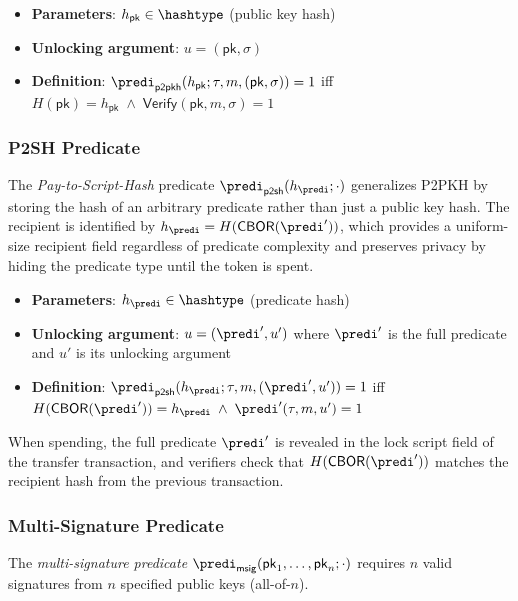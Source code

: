 \begin{itemize}
	\item \textbf{Parameters}: $h_\mathsf{pk} \in \hashtype$ (public key hash)
	\item \textbf{Unlocking argument}: $u = (\mathsf{pk}, \sigma)$
	\item \textbf{Definition}: $\predi_\mathsf{p2pkh}(h_\mathsf{pk}; \tau, m, (\mathsf{pk}, \sigma)) = 1$ iff $H(\mathsf{pk}) = h_\mathsf{pk} \;\land\; \mathsf{Verify}(\mathsf{pk}, m, \sigma) = 1$
\end{itemize}

\subsubsection{P2SH Predicate}\label{sec:p2sh}

The \emph{Pay-to-Script-Hash} predicate $\predi_\mathsf{p2sh}(h_\predi;\cdot)$ generalizes P2PKH by storing the hash of an arbitrary predicate rather than just a public key hash. The recipient is identified by $h_\predi = H(\mathsf{CBOR}(\predi'))$, which provides a uniform-size recipient field regardless of predicate complexity and preserves privacy by hiding the predicate type until the token is spent.

\begin{itemize}
	\item \textbf{Parameters}: $h_\predi \in \hashtype$ (predicate hash)
	\item \textbf{Unlocking argument}: $u = (\predi', u')$ where $\predi'$ is the full predicate and $u'$ is its unlocking argument
	\item \textbf{Definition}: $\predi_\mathsf{p2sh}(h_\predi; \tau, m, (\predi', u')) = 1$ iff $H(\mathsf{CBOR}(\predi')) = h_\predi \;\land\; \predi'(\tau, m, u') = 1$
\end{itemize}

When spending, the full predicate $\predi'$ is revealed in the lock script field of the transfer transaction, and verifiers check that $H(\mathsf{CBOR}(\predi'))$ matches the recipient hash from the previous transaction.

\subsubsection{Multi-Signature Predicate}

The \emph{multi-signature predicate} $\predi_\mathsf{msig}(\mathsf{pk}_1, \ldots, \mathsf{pk}_n;\cdot)$ requires $n$ valid signatures from $n$ specified public keys (all-of-$n$).

